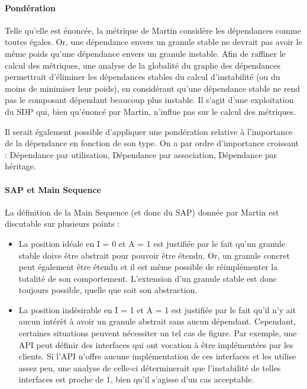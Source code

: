 \documentclass{scrartcl}
\begin{document}
    \paragraph{Pondération}Telle qu'elle est énoncée, la métrique de Martin considère les dépendances comme toutes égales. Or, une dépendance envers un granule stable ne devrait pas avoir le même poids qu'une dépendance envers un granule instable. Afin de raffiner le calcul des métriques, une analyse de la globalité du graphe des dépendances permettrait d'éliminer les dépendances stables du calcul d'instabilité (ou du moins de minimiser leur poids), en considérant qu'une dépendance stable ne rend pas le composant dépendant beaucoup plus instable. Il s'agit d'une exploitation du SDP qui, bien qu'énoncé par Martin, n'influe pas sur le calcul des métriques.
    
    Il serait également possible d'appliquer une pondération relative à l'importance de la dépendance en fonction de son type. On a par ordre d'importance croissant : Dépendance par utilisation, Dépendance par association, Dépendance par héritage.
    
    \paragraph{SAP et Main Sequence}La définition de la Main Sequence (et donc du SAP) donnée par Martin est discutable sur plusieurs points :
    \begin{itemize}
        \item La position idéale en I = 0 et A = 1 est justifiée par le fait qu'un granule stable doive être abstrait pour pouvoir être étendu. Or, un granule concret peut également être étendu et il est même possible de réimplémenter la totalité de son comportement. L'extension d'un granule stable est donc toujours possible, quelle que soit son abstraction.
        \item La position indésirable en I = 1 et A = 1 est justifiée par le fait qu'il n'y ait aucun intérêt à avoir un granule abstrait sans aucun dépendant. Cependant, certaines situations peuvent nécessiter un tel cas de figure. Par exemple, une API peut définir des interfaces qui ont vocation à être implémentées par les clients. Si l'API n'offre aucune implémentation de ces interfaces et les utilise assez peu, une analyse de celle-ci déterminerait que l'instabilité de telles interfaces est proche de 1, bien qu'il s'agisse d'un cas acceptable.
    \end{itemize}
\end{document}
